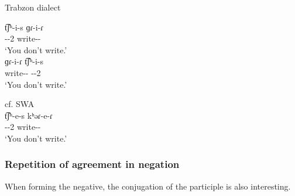 \begin{exe}
	\ex \begin{xlist}
		\ex Trabzon dialect \label{sent:Trabzon:morpho:verb:neg}
		\begin{xlist}
			\ex \gll t͡ʃʰ-i-s ɡɾ-i-ɾ \\
			{\neggloss}-{\aux}-2{\sg} write-{\thgloss}-{\cn}\\
			\trans `You don't write.'\\
			\ex \gll ɡɾ-i-ɾ t͡ʃʰ-i-s \\
			write-{\thgloss}-{\cn} {\neggloss}-{\aux}-2{\sg} \\
			\trans `You don't write.'\\
		\end{xlist}
		\ex cf. SWA  \\
		\gll t͡ʃʰ-e-s kʰəɾ-e-ɾ \\
		{\neggloss}-{\aux}-2{\sg} write-{\thgloss}-{\cn}\\
		\trans `You don't write.'\\
	\end{xlist}
\end{exe}

\subsubsection{Repetition of agreement in negation}

When forming the negative, the conjugation of the participle is also interesting. 

